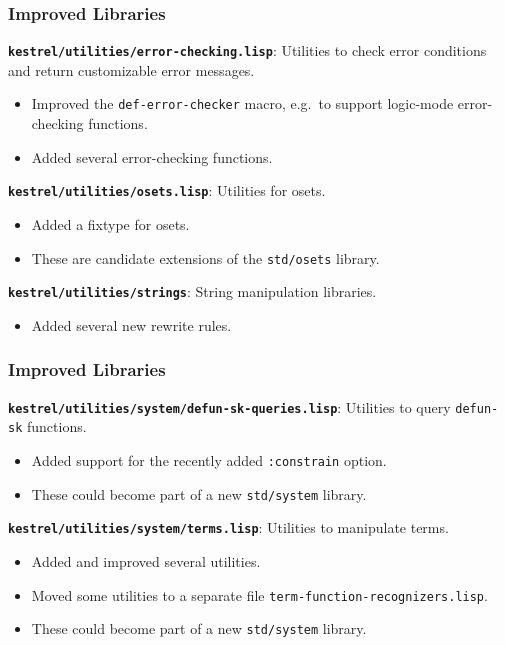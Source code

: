 \documentclass{beamer}
\newcommand{\code}[1]{\texttt{#1}}
\newcommand{\bookpath}[1]{\textbf{\code{#1}}}
\newcommand{\implibtitle}{\frametitle{Improved Libraries}}
\newcommand{\separation}{\vspace*{1ex}}
\begin{document}

\begin{frame}

\implibtitle

\bookpath{kestrel/utilities/error-checking.lisp}:
Utilities to check error conditions and return customizable error messages.
\begin{itemize}
\item
Improved the \code{def-error-checker} macro,
e.g.\ to support logic-mode error-checking functions.
\item
Added several error-checking functions.
\end{itemize}

\separation

\bookpath{kestrel/utilities/osets.lisp}:
Utilities for osets.
\begin{itemize}
\item
Added a fixtype for osets.
\item
These are candidate extensions of the \code{std/osets} library.
\end{itemize}

\separation

\bookpath{kestrel/utilities/strings}:
String manipulation libraries.
\begin{itemize}
\item Added several new rewrite rules.
\end{itemize}

\end{frame}


\begin{frame}

\implibtitle

\bookpath{kestrel/utilities/system/defun-sk-queries.lisp}:
Utilities to query \code{defun-sk} functions.
\begin{itemize}
\item
Added support for the recently added \code{:constrain} option.
\item
These could become part of a new \code{std/system} library.
\end{itemize}

\separation

\bookpath{kestrel/utilities/system/terms.lisp}:
Utilities to manipulate terms.
\begin{itemize}
\item
Added and improved several utilities.
\item
Moved some utilities to a separate file
\code{term-function-recognizers.lisp}.
\item
These could become part of a new \code{std/system} library.
\end{itemize}

\end{frame}
\end{document}
